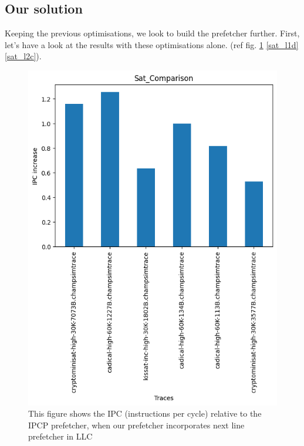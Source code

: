 \documentclass[conference]{IEEEtran}
\begin{document}
\subsection{Our solution}
Keeping the previous optimisations, we look to build the prefetcher further. First, let's have a look at the results with these optimisations alone. (ref fig. \ref{sat_ipc} \ref{sat_l1d} \ref{sat_l2c}).

\begin{figure}
\includegraphics[scale=0.5]{Images/sat_ipc.png}
\caption{This figure shows the IPC (instructions per cycle) relative to the IPCP prefetcher, when our prefetcher incorporates next line prefetcher in LLC}
\label{sat_ipc}
\end{figure}
\end{document}
